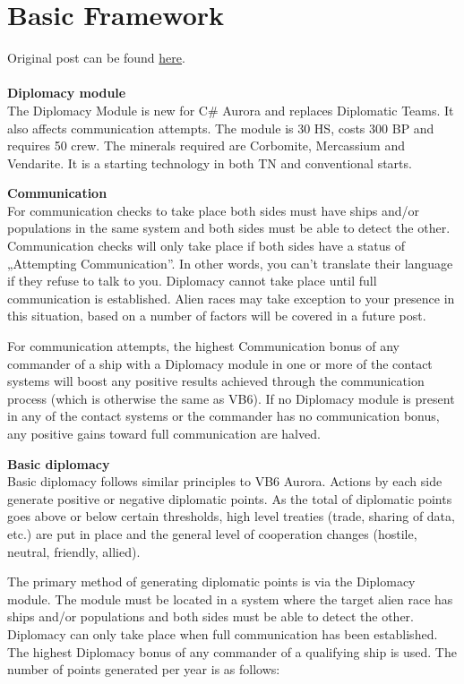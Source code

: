 \documentclass[../Aurora C# unofficial manual.tex]{subfiles}
\begin{document}
	\section{Basic Framework}\label{1_basic_framework}
	Original post can be found
	\href{http://aurora2.pentarch.org/index.php?topic=8495.msg118258#msg118258}{here}.
	\\\\
	
	\textbf{Diplomacy module}\\
	The Diplomacy Module is new for C\# Aurora and replaces Diplomatic Teams. It also affects communication attempts. The module is 30 HS, costs 300 BP and requires 50 crew. The minerals required are Corbomite, Mercassium and Vendarite. It is a starting technology in both TN and conventional starts.
	
	\textbf{Communication}\\
	For communication checks to take place both sides must have ships and/or populations in the same system and both sides must be able to detect the other. Communication checks will only take place if both sides have a status of „Attempting Communication”. In other words, you can't translate their language if they refuse to talk to you. Diplomacy cannot take place until full communication is established. Alien races may take exception to your presence in this situation, based on a number of factors will be covered in a future post.
	
	For communication attempts, the highest Communication bonus of any commander of a ship with a Diplomacy module in one or more of the contact systems will boost any positive results achieved through the communication process (which is otherwise the same as VB6). If no Diplomacy module is present in any of the contact systems or the commander has no communication bonus, any positive gains toward full communication are halved.
	
	\textbf{Basic diplomacy}\\
	Basic diplomacy follows similar principles to VB6 Aurora. Actions by each side generate positive or negative diplomatic points. As the total of diplomatic points goes above or below certain thresholds, high level treaties (trade, sharing of data, etc.) are put in place and the general level of cooperation changes (hostile, neutral, friendly, allied).
	
	The primary method of generating diplomatic points is via the Diplomacy module. The module must be located in a system where the target alien race has ships and/or populations and both sides must be able to detect the other. Diplomacy can only take place when full communication has been established. The highest Diplomacy bonus of any commander of a qualifying ship is used. The number of points generated per year is as follows:
	
\end{document}
